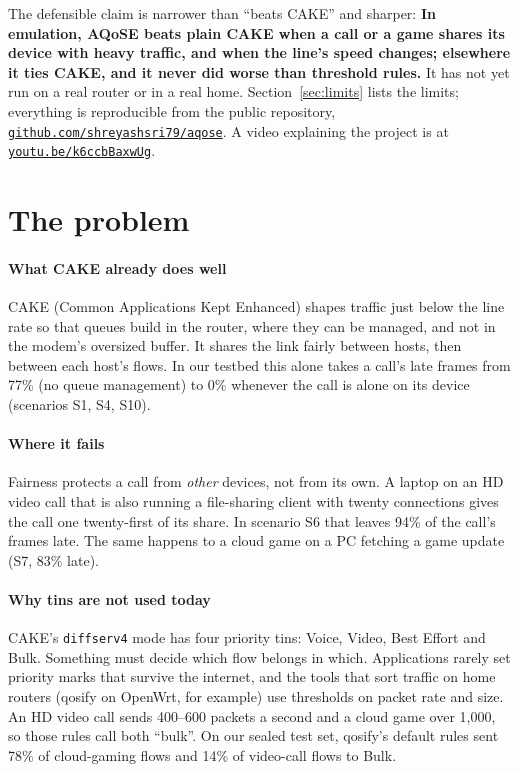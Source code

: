 \documentclass[11pt,a4paper]{article}
\begin{document}
The defensible claim is narrower than ``beats CAKE'' and sharper: \textbf{In emulation, AQoSE beats plain CAKE when a call or a game shares its device with heavy traffic, and when the line's speed changes; elsewhere it ties CAKE, and it never did worse than threshold rules.} It has not yet run on a real router or in a real home. Section~\ref{sec:limits} lists the limits; everything is reproducible from the public repository, \href{https://github.com/shreyashsri79/aqose}{\texttt{github.com/shreyashsri79/aqose}}. A video explaining the project is at \href{https://youtu.be/k6ccbBaxwUg}{\texttt{youtu.be/k6ccbBaxwUg}}.

\clearpage{}
\tableofcontents

\section{The problem}

\paragraph{What CAKE already does well} CAKE (Common Applications Kept Enhanced) shapes traffic just below the line rate so that queues build in the router, where they can be managed, and not in the modem's oversized buffer. It shares the link fairly between hosts, then between each host's flows. In our testbed this alone takes a call's late frames from 77\% (no queue management) to 0\% whenever the call is alone on its device (scenarios S1, S4, S10).

\paragraph{Where it fails} Fairness protects a call from \emph{other} devices, not from its own. A laptop on an HD video call that is also running a file-sharing client with twenty connections gives the call one twenty-first of its share. In scenario S6 that leaves 94\% of the call's frames late. The same happens to a cloud game on a PC fetching a game update (S7, 83\% late).

\paragraph{Why tins are not used today} CAKE's \texttt{diffserv4} mode has four priority tins: Voice, Video, Best Effort and Bulk. Something must decide which flow belongs in which. Applications rarely set priority marks that survive the internet, and the tools that sort traffic on home routers (qosify on OpenWrt, for example) use thresholds on packet rate and size. An HD video call sends 400--600 packets a second and a cloud game over 1,000, so those rules call both ``bulk''. On our sealed test set, qosify's default rules sent 78\% of cloud-gaming flows and 14\% of video-call flows to Bulk.
\end{document}
